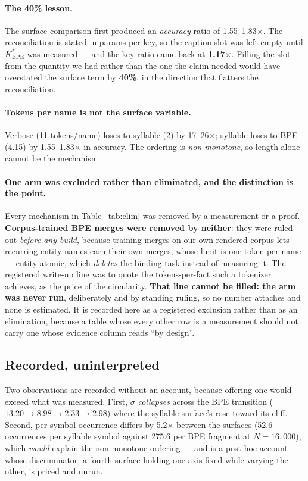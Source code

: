 \paragraph{The 40\% lesson.} The surface comparison first produced an \emph{accuracy} ratio of
1.55--1.83$\times$. The reconciliation is stated in params per key, so the caption slot was left
empty until $K^*_{\text{BPE}}$ was measured --- and the key ratio came back at
\textbf{1.17$\times$}. Filling the slot from the quantity we had rather than the one the claim needed
would have overstated the surface term by \textbf{40\%}, in the direction that flatters the
reconciliation.

\paragraph{Tokens per name is not the surface variable.} Verbose (11 tokens/name) loses to syllable
(2) by 17--26$\times$; syllable loses to BPE (4.15) by 1.55--1.83$\times$ in accuracy. The ordering
is \emph{non-monotone}, so length alone cannot be the mechanism.

\paragraph{One arm was excluded rather than eliminated, and the distinction is the point.} Every
mechanism in Table~\ref{tab:elim} was removed by a measurement or a proof. \textbf{Corpus-trained
BPE merges were removed by neither}: they were ruled out \emph{before any build}, because training
merges on our own rendered corpus lets recurring entity names earn their own merges, whose limit is
one token per name --- entity-atomic, which \emph{deletes} the binding task instead of measuring it.
The registered write-up line was to quote the tokens-per-fact such a tokenizer achieves, as the
price of the circularity. \textbf{That line cannot be filled: the arm was never run}, deliberately
and by standing ruling, so no number attaches and none is estimated. It is recorded here as a
registered exclusion rather than as an elimination, because a table whose every other row is a
measurement should not carry one whose evidence column reads ``by design''.

\subsection{Recorded, uninterpreted}

Two observations are recorded without an account, because offering one would exceed what was
measured. First, $\sigma$ \emph{collapses} across the BPE transition ($13.20 \to 8.98 \to 2.33 \to
2.98$) where the syllable surface's rose toward its cliff. Second, per-symbol occurrence differs by
5.2$\times$ between the surfaces (52.6 occurrences per syllable symbol against 275.6 per BPE
fragment at $N = 16{,}000$), which \emph{would} explain the non-monotone ordering --- and is a
post-hoc account whose discriminator, a fourth surface holding one axis fixed while varying the
other, is priced and unrun.
